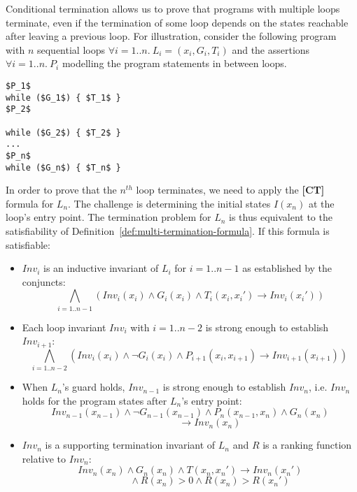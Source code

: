 \documentclass[preprint]{sigplanconf}
\theoremstyle{definition}
\begin{document}
\iffalse

Conditional termination allows us to
prove that programs with multiple loops terminate, even if the termination of some loop depends on the states
reachable after leaving a previous loop.
For illustration, consider the following program with $n$ sequential loops $\forall i=1..n. ~L_i=(x_i,G_i,T_i)$ and
the assertions $\forall i=1..n. ~P_i$ modelling the program statements in between loops. 

\begin{lstlisting}[mathescape=true]
$P_1$
while ($G_1$) { $T_1$ }
$P_2$

while ($G_2$) { $T_2$ }
...
$P_n$
while ($G_n$) { $T_n$ }
\end{lstlisting}

In order to prove that the $n^{th}$ loop terminates, we need to apply the {\bf [CT]} formula for $L_n$.
The challenge is determining the initial states  $I(x_n)$ at the loop's entry point.  
The termination problem for $L_n$ is thus equivalent to the satisfiability of
Definition~\ref{def:multi-termination-formula}.  If this formula is satisfiable:
\begin{itemize}
\item $Inv_i$ is an inductive invariant of $L_i$ for $i=1..{n-1}$ as established by the conjuncts:
$$\bigwedge_{i=1..n{-}1} (Inv_i(x_i) \wedge G_i(x_i) \wedge T_i(x_i, x_i') \rightarrow Inv_i(x_i')) $$

\item Each loop invariant $Inv_i$ with $i=1..{n-2}$ is strong enough to establish $Inv_{i+1}$:
$$\bigwedge_{i=1..n{-}2} (Inv_i(x_i) \wedge \lnot G_i(x_i) \wedge P_{i+1}(x_i, x_{i+1}) {\rightarrow} Inv_{i+1}(x_{i+1})) ~$$

\item When $L_n$'s guard holds, $Inv_{n-1}$ 
is strong enough to establish $Inv_n$, i.e. $Inv_n$ holds for the program states after $L_n$'s entry point:
$$ Inv_{n-1}(x_{n-1}) \wedge \lnot G_{n-1}(x_{n-1}) \wedge P_n(x_{n-1},x_n) \wedge G_n(x_n) $$
$$\qquad\qquad\rightarrow Inv_n(x_n)$$

\item $Inv_n$ is a supporting termination invariant of $L_n$ and $R$ is a ranking function relative to $Inv_n$:
$$Inv_n(x_n) \wedge G_n(x_n) \wedge T(x_n, x_n') \rightarrow Inv_n(x_n')$$
$$ \qquad \qquad \wedge R(x_n) > 0 \wedge R(x_n) > R(x_n')$$
\end{itemize}
\end{document}
